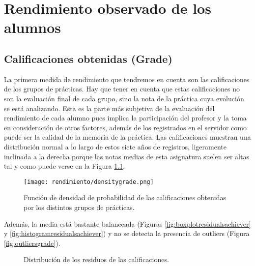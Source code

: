 \chapter{Rendimiento observado de los alumnos}

\section{Calificaciones obtenidas (Grade)}

La primera medida de rendimiento que tendremos en cuenta son las calificaciones de los grupos de prácticas. Hay que tener en cuenta que estas calificaciones no son la evaluación final de cada grupo, sino la nota de la práctica cuya evolución se está analizando. Esta es la parte más subjetiva de la evaluación del rendimiento de cada alumno pues implica la participación del profesor y la toma en consideración de otros factores, además de los registrados en el servidor como puede ser la calidad de la memoria de la práctica. Las calificaciones muestran una distribución normal a lo largo de estos siete años de registros, ligeramente inclinada a la derecha porque las notas medias de esta asignatura suelen ser altas tal y como puede verse en la Figura \ref{fig:densityplotachiever}.

\begin{figure}[H]
    \centering
    \texttt{[image: rendimiento/densitygrade.png]}
    \caption{Función de densidad de probabilidad de las calificaciones obtenidas por los distintos grupos de prácticas.}
    \label{fig:densityplotachiever}
\end{figure}

Además, la media está bastante balanceada (Figuras \ref{fig:boxplotresidualsachiever} y \ref{fig:histogramresidualsachiever}) y no se detecta la presencia de outliers (Figura \ref{fig:outliersgrade}).

\begin{figure}[H]
\centering
{}\qquad
{}
\caption{Distribución de los residuos de las calificaciones.}
\label{fig:achiever}
\end{figure}

